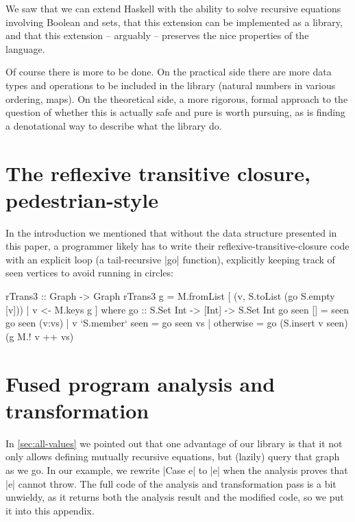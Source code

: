 \documentclass[manuscript,review,screen,acmsmall]{acmart}
\begin{document}
We saw that we can extend Haskell with the ability to solve recursive equations involving Boolean and sets, that this extension can be implemented as a library, and that this extension -- arguably -- preserves the nice properties of the language.

Of course there is more to be done. On the practical side there are more data types and operations to be included in the library (natural numbers in various ordering, maps). On the theoretical side, a more rigorous, formal approach to the question of whether this is actually safe and pure is worth pursuing, as is finding a denotational way to describe what the library do.




\clearpage

\appendix
\section{The reflexive transitive closure, pedestrian-style}\label{sec:imp}

In the introduction we mentioned that without the data structure presented in this paper, a programmer likely has to write their reflexive-transitive-closure code with an explicit loop (a tail-recursive |go| function), explicitly keeping track of seen vertices to avoid running in circles:
\begin{code}
rTrans3 :: Graph -> Graph
rTrans3 g = M.fromList [ (v, S.toList (go S.empty [v])) | v <- M.keys g ]
  where
    go :: S.Set Int -> [Int] -> S.Set Int
    go seen [] = seen
    go seen (v:vs)  |  v `S.member` seen  =  go seen vs
                    |  otherwise          =  go (S.insert v seen) (g M.! v ++ vs)
\end{code}

\section{Fused program analysis and transformation}\label{sec:proganalexp}

In \cref{sec:all-values} we pointed out that one advantage of our library is that it not only allows defining mutually recursive equations, but (lazily) query that graph as we go. In our example, we rewrite |Case e| to |e| when the analysis proves that |e| cannot throw. The full code of the analysis and transformation pass is a bit unwieldy, as it returns both the analysis result and the modified code, so we put it into this appendix.
\end{document}
